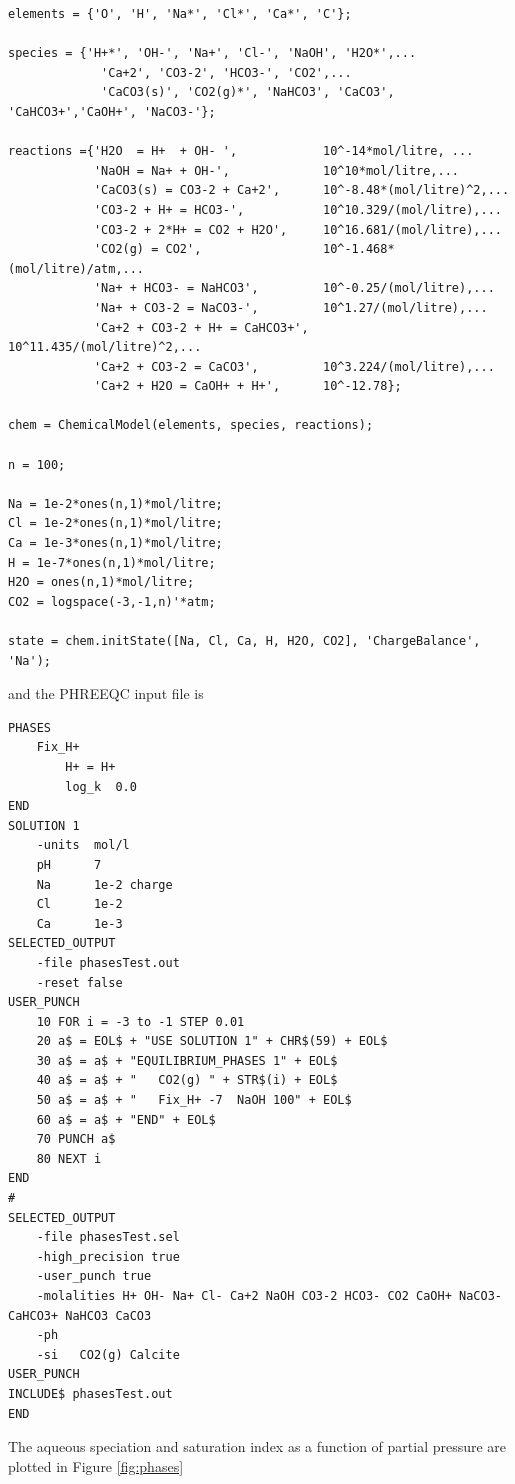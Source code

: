 \documentclass{article}
\begin{document}
\begin{lstlisting}
elements = {'O', 'H', 'Na*', 'Cl*', 'Ca*', 'C'};

species = {'H+*', 'OH-', 'Na+', 'Cl-', 'NaOH', 'H2O*',...
             'Ca+2', 'CO3-2', 'HCO3-', 'CO2',...
             'CaCO3(s)', 'CO2(g)*', 'NaHCO3', 'CaCO3', 'CaHCO3+','CaOH+', 'NaCO3-'};

reactions ={'H2O  = H+  + OH- ',            10^-14*mol/litre, ...
            'NaOH = Na+ + OH-',             10^10*mol/litre,...
            'CaCO3(s) = CO3-2 + Ca+2',      10^-8.48*(mol/litre)^2,...
            'CO3-2 + H+ = HCO3-',           10^10.329/(mol/litre),...
            'CO3-2 + 2*H+ = CO2 + H2O',     10^16.681/(mol/litre),...
            'CO2(g) = CO2',                 10^-1.468*(mol/litre)/atm,...
            'Na+ + HCO3- = NaHCO3',         10^-0.25/(mol/litre),...
            'Na+ + CO3-2 = NaCO3-',         10^1.27/(mol/litre),...
            'Ca+2 + CO3-2 + H+ = CaHCO3+',  10^11.435/(mol/litre)^2,...
            'Ca+2 + CO3-2 = CaCO3',         10^3.224/(mol/litre),...
            'Ca+2 + H2O = CaOH+ + H+',      10^-12.78};

chem = ChemicalModel(elements, species, reactions);

n = 100;

Na = 1e-2*ones(n,1)*mol/litre;
Cl = 1e-2*ones(n,1)*mol/litre;
Ca = 1e-3*ones(n,1)*mol/litre;
H = 1e-7*ones(n,1)*mol/litre;
H2O = ones(n,1)*mol/litre;
CO2 = logspace(-3,-1,n)'*atm;

state = chem.initState([Na, Cl, Ca, H, H2O, CO2], 'ChargeBalance', 'Na');
\end{lstlisting}
and the PHREEQC input file is

\begin{Verbatim}[frame=single,fontsize=\footnotesize]
PHASES
	Fix_H+
		H+ = H+
		log_k  0.0
END
SOLUTION 1
	-units	mol/l
	pH 		7
	Na 		1e-2 charge
	Cl 		1e-2
	Ca 		1e-3 
SELECTED_OUTPUT
    -file phasesTest.out
    -reset false
USER_PUNCH
	10 FOR i = -3 to -1 STEP 0.01
  	20 a$ = EOL$ + "USE SOLUTION 1" + CHR$(59) + EOL$
	30 a$ = a$ + "EQUILIBRIUM_PHASES 1" + EOL$
	40 a$ = a$ + "   CO2(g) " + STR$(i) + EOL$
	50 a$ = a$ + "   Fix_H+ -7  NaOH 100" + EOL$
	60 a$ = a$ + "END" + EOL$
	70 PUNCH a$
	80 NEXT i
END
#
SELECTED_OUTPUT
	-file phasesTest.sel
	-high_precision true
	-user_punch true
	-molalities H+ OH- Na+ Cl- Ca+2 NaOH CO3-2 HCO3- CO2 CaOH+ NaCO3- CaHCO3+ NaHCO3 CaCO3
	-ph
	-si   CO2(g) Calcite
USER_PUNCH
INCLUDE$ phasesTest.out
END
\end{Verbatim}
The aqueous speciation and saturation index as a function of  partial pressure are plotted in Figure \ref{fig:phases}
\end{document}
